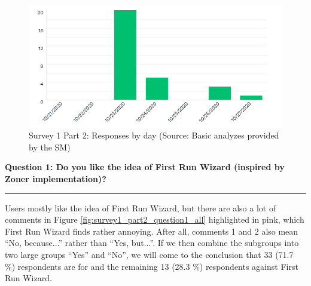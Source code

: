 \documentclass[a4paper,10pt,twoside]{article}
\begin{document}
\vspace{0.3cm}
\begin{figure}[hbt!] 
\begin{center}
\includegraphics[width=15cm]{../surveys/analyzed_data/survey1_part2_insight2.png} 
\caption[Survey 1 Part 2: Responses by day]{Survey 1 Part 2: Responses by day (Source: Basic analyzes provided by the SM)}
\label{fig:survey1_part2_insight2}
\end{center}
\end{figure}

\newpage
\noindent \textbf{Question 1: Do you like the idea of First Run Wizard (inspired by Zoner implementation)?}
\par\noindent\rule{\textwidth}{0.4pt}
\noindent Users mostly like the idea of First Run Wizard, but there are also a lot of comments in Figure \ref{fig:survey1_part2_question1_all} highlighted in pink, which First Run Wizard finds rather annoying. After all, comments 1 and 2 also mean ``No, because...'' rather than ``Yes, but...''. If we then combine the subgroups into two large groups ``Yes'' and ``No'', we will come to the conclusion that 33 (71.7 \%) respondents are for and the remaining 13 (28.3 \%) respondents against First Run Wizard.
\end{document}
